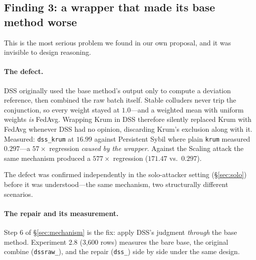 \documentclass[11pt,a4paper]{article}
\newcommand{\code}[1]{\texttt{\small #1}}
\begin{document}
\subsection{Finding 3: a wrapper that made its base method worse}
\label{sec:finding3}

This is the most serious problem we found in our own proposal, and it was
invisible to design reasoning.

\paragraph{The defect.} DSS originally used the base method's output only
to compute a deviation reference, then combined the raw batch itself.
Stable colluders never trip the conjunction, so every weight stayed at
$1.0$---and a weighted mean with uniform weights \emph{is} FedAvg.
Wrapping Krum in DSS therefore silently replaced Krum with FedAvg whenever
DSS had no opinion, discarding Krum's exclusion along with it. Measured:
\code{dss\_krum} at $16.99$ against Persistent Sybil where plain
\code{krum} measured $0.297$---a $57\times$ regression \emph{caused by the
wrapper}. Against the Scaling attack the same mechanism produced a
$577\times$ regression ($171.47$ vs.\ $0.297$).

The defect was confirmed independently in the solo-attacker setting
(\S\ref{sec:solo}) before it was understood---the same mechanism, two
structurally different scenarios.

\paragraph{The repair and its measurement.} Step 6 of
\S\ref{sec:mechanism} is the fix: apply DSS's judgment \emph{through} the
base method. Experiment 2.8 (3{,}600 rows) measures the bare base, the
original combine (\code{dssraw\_}), and the repair (\code{dss\_}) side by
side under the same design.
\end{document}
